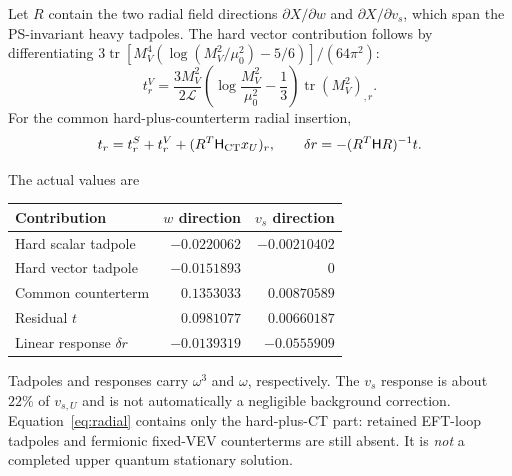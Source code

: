 \documentclass[11pt]{article}
\newcommand{\tr}{\operatorname{tr}}
\newcommand{\LOOP}{\mathcal L}
\begin{document}
Let $R$ contain the two radial field directions $\partial X/\partial w$
and $\partial X/\partial v_s$, which span the PS-invariant heavy tadpoles.
The hard vector contribution follows by differentiating
$3\tr[M_V^4(\log(M_V^2/\mu_0^2)-5/6)]/(64\pi^2)$:
\begin{equation}
 t^V_r=\frac{3M_V^2}{2\LOOP}
 \left(\log\frac{M_V^2}{\mu_0^2}-\frac13\right)
 \tr (M_V^2)_{,r}.
\end{equation}
For the common hard-plus-counterterm radial insertion,
\begin{equation}
 t_r=t^S_r+t^V_r+(R^T\mathsf H_{\rm CT}x_U)_r,
 \qquad \delta r=-(R^T\mathsf H R)^{-1}t.
 \label{eq:radial}
\end{equation}
\begin{samepage}
The actual values are
\begin{center}
\begin{tabular}{lrr}
\toprule
Contribution & $w$ direction & $v_s$ direction\\
\midrule
Hard scalar tadpole & $-0.0220062$ & $-0.00210402$\\
Hard vector tadpole & $-0.0151893$ & $0$\\
Common counterterm & $0.1353033$ & $0.00870589$\\
Residual $t$ & $0.0981077$ & $0.00660187$\\
Linear response $\delta r$ & $-0.0139319$ & $-0.0555909$\\
\bottomrule
\end{tabular}
\end{center}
\end{samepage}
Tadpoles and responses carry $\omega^3$ and $\omega$, respectively.
The $v_s$ response is about $22\%$ of $v_{s,U}$ and is not automatically
a negligible background correction. Equation~\eqref{eq:radial} contains
only the hard-plus-CT part: retained EFT-loop tadpoles and fermionic
fixed-VEV counterterms are still absent. It is \emph{not} a completed
upper quantum stationary solution.
\end{document}
